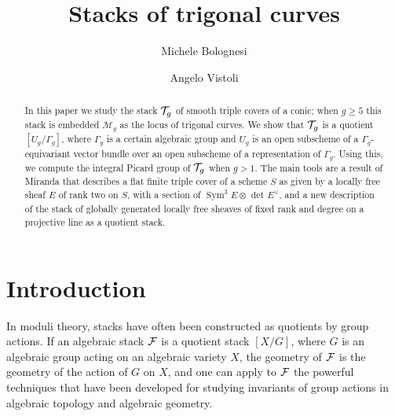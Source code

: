 \documentclass{amsart}
\numberwithin{equation}{section}
\numberwithin{subsection}{section}
\theoremstyle{definition}
\theoremstyle{remark}
\newcommand\cM{\mathcal{M}} \newcommand\cN{\mathcal{N}}
\newcommand{\T}[1][g]{\cT_{#1}}
\newcommand{\sym}{\operatorname{Sym}}
\newcommand{\symthree}[2][]{\sym^{3}_{{#1}}{#2} \otimes_{{#1}} \det\nolimits_{{#1}} {#2}\dual}
\newcommand{\dual}{^{\vee}}
\begin{document}
\title{Stacks of trigonal curves}

\author[Bolognesi]{Michele Bolognesi}
\author[Vistoli]{Angelo Vistoli}

\address[Bolognesi]{Dipartimento di Matematica\\Universit di Roma Tre\\Largo San Leonardo Murialdo, 1
00146 Roma\\Italy}


\address[Vistoli]{Scuola Normale Superiore\\Piazza dei Cavalieri 7\\
56126 Pisa\\Italy}





\begin{abstract}
In this paper we study the stack $\T$ of smooth triple covers of a conic; when $g \geq 5$ this stack is embedded $\cM_{g}$ as the locus of trigonal curves. We show that $\T$ is a quotient $[U_{g}/\Gamma_{g}]$, where $\Gamma_g$ is a certain algebraic group and $U_g$ is an open subscheme of a $\Gamma_g$-equivariant vector bundle over an open subscheme of a representation of $\Gamma_g$. Using this, we compute the integral Picard group of $\mathcal{T}_g$ when $g > 1$. The main tools are a result of Miranda that describes a flat finite triple cover of a scheme $S$ as given by a locally free sheaf $E$ of rank two on $S$, with a section of $\symthree{E}$, and a new description of the stack of globally generated locally free sheaves of  fixed rank and degree on a projective line as a quotient stack. 
\end{abstract}


\maketitle



\section{Introduction}

In moduli theory, stacks have often been constructed as quotients by group actions. If an algebraic stack $\mathcal{F}$ is a quotient stack $[X/G]$, where $G$ is an algebraic group acting on an algebraic variety $X$, the geometry of $\mathcal{F}$ is the geometry of the action of $G$ on $X$, and one can apply to $\mathcal{F}$ the powerful techniques that have been developed for studying invariants of group actions in algebraic topology and algebraic geometry.
\end{document}
